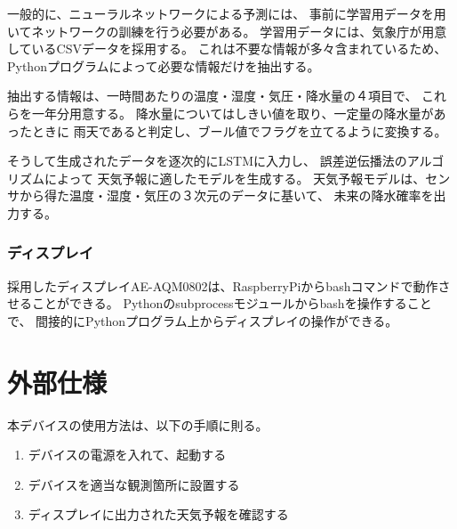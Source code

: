 \documentclass{jsarticle}
\begin{document}
					一般的に、ニューラルネットワークによる予測には、
					事前に学習用データを用いてネットワークの訓練を行う必要がある。
					学習用データには、気象庁が用意しているCSVデータを採用する。
					これは不要な情報が多々含まれているため、
					Pythonプログラムによって必要な情報だけを抽出する。
					
					抽出する情報は、一時間あたりの温度・湿度・気圧・降水量の４項目で、
					これらを一年分用意する。
					降水量についてはしきい値を取り、一定量の降水量があったときに
					雨天であると判定し、ブール値でフラグを立てるように変換する。
					
					そうして生成されたデータを逐次的にLSTMに入力し、
					誤差逆伝播法\cite{Le}のアルゴリズムによって
					天気予報に適したモデルを生成する。
					天気予報モデルは、センサから得た温度・湿度・気圧の３次元のデータに基いて、
					未来の降水確率を出力する。
					
					
				\subsubsection{ディスプレイ}
				
					採用したディスプレイAE-AQM0802は、RaspberryPiからbashコマンドで動作させることができる。
					Pythonのsubprocessモジュールからbashを操作することで、
					間接的にPythonプログラム上からディスプレイの操作ができる。
			
		\section{外部仕様}
		
			
			本デバイスの使用方法は、以下の手順に則る。
			
			\begin{enumerate}
				\item デバイスの電源を入れて、起動する
				\item デバイスを適当な観測箇所に設置する
				\item ディスプレイに出力された天気予報を確認する
			\end{enumerate}
			
\end{document}
